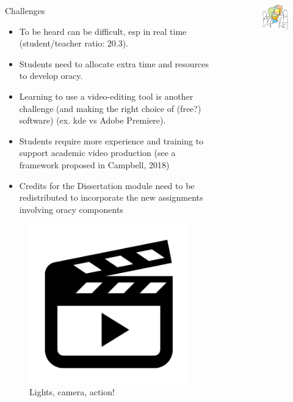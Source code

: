 \documentclass[final]{beamer}
\newlength{\sepwid}
\newlength{\onecolwid}
\newlength{\twocolwid}
\begin{document}
\begin{frame}[t]
\begin{columns}[t]
\begin{column}{\twocolwid}
\begin{columns}[t,totalwidth=\twocolwid]
\begin{column}{\onecolwid}
\begin{block}{Challenges}
\begin{itemize}
	\item To be heard can be difficult, esp in real time (student/teacher ratio: 20.3).
	\item Students need to allocate extra time and resources to develop oracy.
	\item Learning to use a video-editing tool is another challenge (and making the right choice of (free?) software) (ex. kde vs Adobe Premiere).
	\item Students require more experience and training to support academic video production (see a framework proposed in Campbell, 2018)
	\item Credits for the Dissertation module need to be redistributed to incorporate the new assignments involving oracy components
\end{itemize}

\begin{figure}
	\includegraphics[width=0.2\linewidth]{pics/video.png}
	\caption{Lights, camera, action!}
\end{figure}

\end{block}


\end{column} %

\end{columns} %

\end{column} %

\begin{column}{\sepwid}\end{column} %

\begin{column}{\onecolwid} %

\begin{figure}
\includegraphics[width=0.3\linewidth]{pics/oracy.jpeg}
\end{figure}



\end{column}
\end{columns}
\end{frame}
\end{document}
